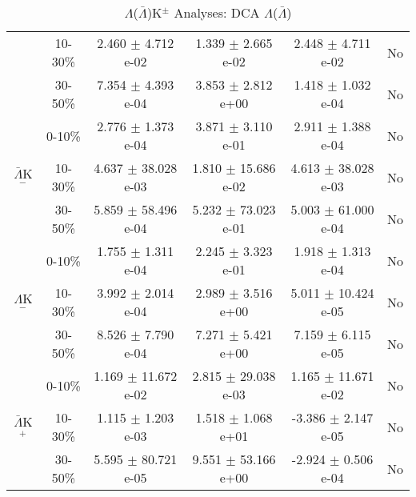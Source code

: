 \documentclass[../AnalysisNoteJBuxton.tex]{subfiles}
\begin{document}
\begin{table}
\begin{tabular}{|c|c|c|c|c|c|}
   & 10-30\% & 2.460 $\pm$ 4.712 e-02 & 1.339 $\pm$ 2.665 e-02 & 2.448 $\pm$ 4.711 e-02 & No \\
   & 30-50\% & 7.354 $\pm$ 4.393 e-04 & 3.853 $\pm$ 2.812 e+00 & 1.418 $\pm$ 1.032 e-04 & No \\
  \hline  
  \multirow{3}{*}{$\bar{\Lambda}$K$^{-}$}
   & 0-10\% & 2.776 $\pm$ 1.373 e-04 & 3.871 $\pm$ 3.110 e-01 & 2.911 $\pm$ 1.388 e-04 & No \\
   & 10-30\% & 4.637 $\pm$ 38.028 e-03 & 1.810 $\pm$ 15.686 e-02 & 4.613 $\pm$ 38.028 e-03 & No \\
   & 30-50\% & 5.859 $\pm$ 58.496 e-04 & 5.232 $\pm$ 73.023 e-01 & 5.003 $\pm$ 61.000 e-04 & No \\
  \hline \hline
  \multirow{3}{*}{$\Lambda$K$^{-}$}   
   &  0-10\% & 1.755 $\pm$ 1.311 e-04 & 2.245 $\pm$ 3.323 e-01 & 1.918 $\pm$ 1.313 e-04 & No \\
   & 10-30\% & 3.992 $\pm$ 2.014 e-04 & 2.989 $\pm$ 3.516 e+00 & 5.011 $\pm$ 10.424 e-05 & No \\
   & 30-50\% & 8.526 $\pm$ 7.790 e-04 & 7.271 $\pm$ 5.421 e+00 & 7.159 $\pm$ 6.115 e-05 & No \\
  \hline  
  \multirow{3}{*}{$\bar{\Lambda}$K$^{+}$}
   & 0-10\% & 1.169 $\pm$ 11.672 e-02 & 2.815 $\pm$ 29.038 e-03 & 1.165 $\pm$ 11.671 e-02 & No \\
   & 10-30\% & 1.115 $\pm$ 1.203 e-03 & 1.518 $\pm$ 1.068 e+01 & -3.386 $\pm$ 2.147 e-05 & No \\
   & 30-50\% & 5.595 $\pm$ 80.721 e-05 & 9.551 $\pm$ 53.166 e+00 & -2.924 $\pm$ 0.506 e-04 & No \\  
  \hline
 \end{tabular}
 \caption{$\Lambda$($\bar{\Lambda}$)K$^{\pm}$ Analyses: DCA $\Lambda$($\bar{\Lambda}$)}
 \label{tab:V0DcaLamKchFull}
\end{table}
\end{document}
